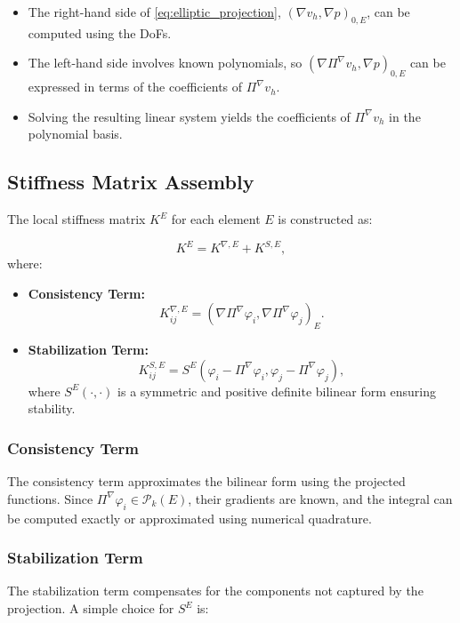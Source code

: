 \documentclass[class=article, crop=false]{standalone}
\begin{document}
\begin{itemize}
    \item The right-hand side of \eqref{eq:elliptic_projection}, $(\nabla v_h, \nabla p)_{0,E}$, can be computed using the DoFs.
    \item The left-hand side involves known polynomials, so $(\nabla \Pi^\nabla v_h, \nabla p)_{0,E}$ can be expressed in terms of the coefficients of $\Pi^\nabla v_h$.
    \item Solving the resulting linear system yields the coefficients of $\Pi^\nabla v_h$ in the polynomial basis.
\end{itemize}

\subsection{Stiffness Matrix Assembly}

The local stiffness matrix $K^E$ for each element $E$ is constructed as:

\[
K^E = K^{\nabla, E} + K^{S, E},
\]
where:

\begin{itemize}
    \item \textbf{Consistency Term:}
    \[
    K^{\nabla, E}_{ij} = (\nabla \Pi^\nabla \varphi_i, \nabla \Pi^\nabla \varphi_j)_E.
    \]
    \item \textbf{Stabilization Term:}
    \[
    K^{S, E}_{ij} = S^E\left( \varphi_i - \Pi^\nabla \varphi_i, \varphi_j - \Pi^\nabla \varphi_j \right),
    \]
    where $S^E(\cdot,\cdot)$ is a symmetric and positive definite bilinear form ensuring stability.
\end{itemize}

\subsubsection{Consistency Term}

The consistency term approximates the bilinear form using the projected functions. Since $\Pi^\nabla \varphi_i \in \mathcal{P}_k(E)$, their gradients are known, and the integral can be computed exactly or approximated using numerical quadrature.

\subsubsection{Stabilization Term}

The stabilization term compensates for the components not captured by the projection. A simple choice for $S^E$ is:
\end{document}

